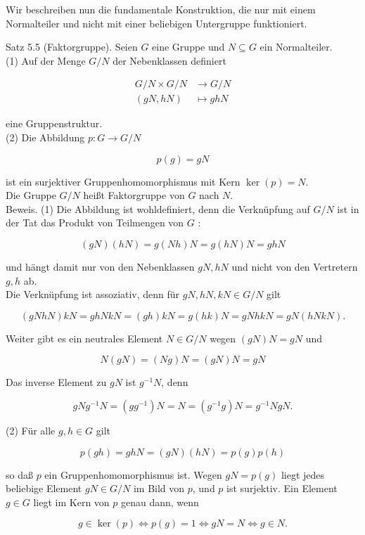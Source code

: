\documentclass[10pt, letterpaper]{article}
\begin{document}
Wir beschreiben nun die fundamentale Konstruktion, die nur mit einem Normalteiler und nicht mit einer beliebigen Untergruppe funktioniert.

Satz 5.5 (Faktorgruppe). Seien $G$ eine Gruppe und $N \subseteq G$ ein Normalteiler.\\
(1) Auf der Menge $G / N$ der Nebenklassen definiert

$$
\begin{aligned}
G / N \times G / N & \rightarrow G / N \\
(g N, h N) & \mapsto g h N
\end{aligned}
$$

eine Gruppenstruktur.\\
(2) Die Abbildung $p: G \rightarrow G / N$

$$
p(g)=g N
$$

ist ein surjektiver Gruppenhomomorphismus mit Kern $\operatorname{ker}(p)=N$.\\
Die Gruppe $G / N$ heißt Faktorgruppe von $G$ nach $N$.\\
Beweis. (1) Die Abbildung ist wohldefiniert, denn die Verknüpfung auf $G / N$ ist in der Tat das Produkt von Teilmengen von $G$ :

$$
(g N)(h N)=g(N h) N=g(h N) N=g h N
$$

und hängt damit nur von den Nebenklassen $g N, h N$ und nicht von den Vertretern $g, h$ ab.\\
Die Verknüpfung ist assoziativ, denn für $g N, h N, k N \in G / N$ gilt

$$
(g N h N) k N=g h N k N=(g h) k N=g(h k) N=g N h k N=g N(h N k N) .
$$

Weiter gibt es ein neutrales Element $N \in G / N$ wegen $(g N) N=g N$ und

$$
N(g N)=(N g) N=(g N) N=g N
$$

Das inverse Element zu $g N$ ist $g^{-1} N$, denn

$$
g N g^{-1} N=\left(g g^{-1}\right) N=N=\left(g^{-1} g\right) N=g^{-1} N g N .
$$

(2) Für alle $g, h \in G$ gilt

$$
p(g h)=g h N=(g N)(h N)=p(g) p(h)
$$

so daß $p$ ein Gruppenhomomorphismus ist. Wegen $g N=p(g)$ liegt jedes beliebige Element $g N \in G / N$ im Bild von $p$, und $p$ ist surjektiv. Ein Element $g \in G$ liegt im Kern von $p$ genau dann, wenn

$$
g \in \operatorname{ker}(p) \Longleftrightarrow p(g)=1 \Longleftrightarrow g N=N \Longleftrightarrow g \in N .
$$
\end{document}
